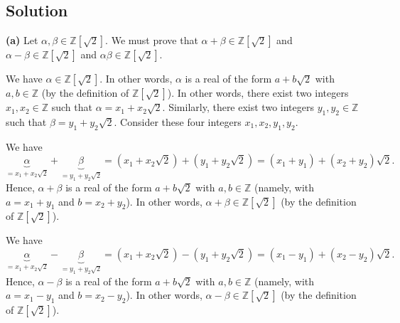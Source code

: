 \documentclass[paper=a4, fontsize=12pt]{scrartcl}%
\theoremstyle{plainsl}
\theoremstyle{definition}
\theoremstyle{remark}
\begin{document}
\subsection{Solution}

\textbf{(a)} Let $\alpha,\beta\in\mathbb{Z}\left[  \sqrt{2}\right]  $. We must
prove that $\alpha+\beta\in\mathbb{Z}\left[  \sqrt{2}\right]  $ and
$\alpha-\beta\in\mathbb{Z}\left[  \sqrt{2}\right]  $ and $\alpha\beta
\in\mathbb{Z}\left[  \sqrt{2}\right]  $.

We have $\alpha\in\mathbb{Z}\left[  \sqrt{2}\right]  $. In other words,
$\alpha$ is a real of the form $a+b\sqrt{2}$ with $a,b\in\mathbb{Z}$ (by the
definition of $\mathbb{Z}\left[  \sqrt{2}\right]  $). In other words, there
exist two integers $x_{1},x_{2}\in\mathbb{Z}$ such that $\alpha=x_{1}%
+x_{2}\sqrt{2}$. Similarly, there exist two integers $y_{1},y_{2}\in
\mathbb{Z}$ such that $\beta=y_{1}+y_{2}\sqrt{2}$. Consider these four
integers $x_{1},x_{2},y_{1},y_{2}$.

We have%
\[
\underbrace{\alpha}_{=x_{1}+x_{2}\sqrt{2}}+\underbrace{\beta}_{=y_{1}%
+y_{2}\sqrt{2}}=\left(  x_{1}+x_{2}\sqrt{2}\right)  +\left(  y_{1}+y_{2}%
\sqrt{2}\right)  =\left(  x_{1}+y_{1}\right)  +\left(  x_{2}+y_{2}\right)
\sqrt{2}.
\]
Hence, $\alpha+\beta$ is a real of the form $a+b\sqrt{2}$ with $a,b\in
\mathbb{Z}$ (namely, with $a=x_{1}+y_{1}$ and $b=x_{2}+y_{2}$). In other
words, $\alpha+\beta\in\mathbb{Z}\left[  \sqrt{2}\right]  $ (by the definition
of $\mathbb{Z}\left[  \sqrt{2}\right]  $).

We have%
\[
\underbrace{\alpha}_{=x_{1}+x_{2}\sqrt{2}}-\underbrace{\beta}_{=y_{1}%
+y_{2}\sqrt{2}}=\left(  x_{1}+x_{2}\sqrt{2}\right)  -\left(  y_{1}+y_{2}%
\sqrt{2}\right)  =\left(  x_{1}-y_{1}\right)  +\left(  x_{2}-y_{2}\right)
\sqrt{2}.
\]
Hence, $\alpha-\beta$ is a real of the form $a+b\sqrt{2}$ with $a,b\in
\mathbb{Z}$ (namely, with $a=x_{1}-y_{1}$ and $b=x_{2}-y_{2}$). In other
words, $\alpha-\beta\in\mathbb{Z}\left[  \sqrt{2}\right]  $ (by the definition
of $\mathbb{Z}\left[  \sqrt{2}\right]  $).
\end{document}
